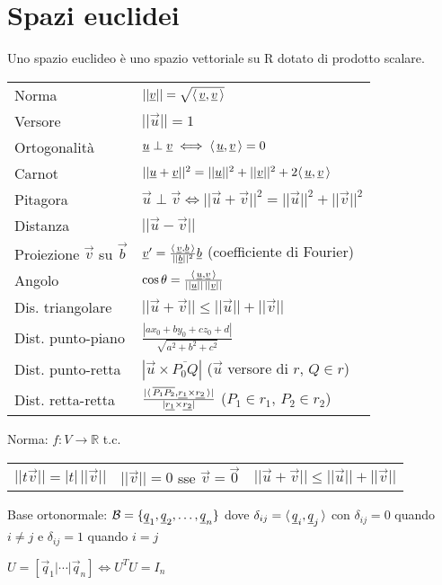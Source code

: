 \section{Spazi euclidei}

Uno spazio euclideo è uno spazio vettoriale su R dotato di prodotto scalare.

\begin{tabular}{ll}
	Norma & $||\underline{v}|| = \sqrt{\langle\,\underline{v},\underline{v}\,\rangle}$ \\
	Versore & $||\vec{u}|| = 1$ \\
	Ortogonalità & $\underline{u} \perp \underline{v} \iff \langle\,\underline{u},\underline{v}\,\rangle = 0$ \\
	Carnot & $||\underline{u}+\underline{v}||^2 = ||\underline{u}||^2+||\underline{v}||^2+2\langle\,\underline{u},\underline{v}\,\rangle$ \\
	Pitagora & $\vec{u} \perp \vec{v} \iff ||\vec{u}+\vec{v}||^2 = ||\vec{u}||^2+||\vec{v}||^2$ \\
	Distanza & $||\vec{u}-\vec{v}||$ \\
	Proiezione $\vec{v}$ su $\vec{b}$ & $\underline{v}' = \frac{\langle\,\underline{v},\underline{b}\,\rangle}{||\underline{b}||^2}\underline{b}$ (coefficiente di Fourier) \\
	Angolo & $\cos \theta = \frac{\langle\,\underline{u},\underline{v}\,\rangle}{||\underline{u}||\,||\underline{v}||}$ \\
	Dis. triangolare & $||\vec{u}+\vec{v}|| \le ||\vec{u}||+||\vec{v}||$ \\
	Dist. punto-piano & $\frac{|ax_0 + by_0 + cz_0 + d|}{\sqrt{a^2 + b^2 + c^2}}$ \\
	Dist. punto-retta & $|\vec{u} \times \overline{P_0Q}|$ ($\vec{u}$ versore di $r$, $Q \in r$) \\
	Dist. retta-retta & $\frac{|\langle\,\overline{P_1P_2},\underline{r_1} \times \underline{r_2}\,\rangle|}{|\underline{r_1} \times \underline{r_2}|}$ ($P_1 \in r_1$, $P_2 \in r_2$)
\end{tabular}

Norma: $f: V \rightarrow \mathbb{R}$ t.c.
\begin{tabular}{lll}
	$||t\vec{v}|| = |t|\,||\vec{v}||$ &
	$||\vec{v}|| = 0$ sse $\vec{v} = \vec{0}$ &
	$||\vec{u}+\vec{v}|| \le ||\vec{u}||+||\vec{v}||$
\end{tabular}

Base ortonormale: $\mathcal{B} = \{\underline{q}_1, \underline{q}_2, \dots, \underline{q}_n\}$ dove $\delta_{ij} = \langle\,\underline{q}_i,\underline{q}_j\,\rangle$ con $\delta_{ij} = 0$ quando $i \ne j$ e $\delta_{ij} = 1$ quando $i = j$

$U = [\vec{q}_1 | \cdots | \vec{q}_n] \iff U^TU=I_n$
